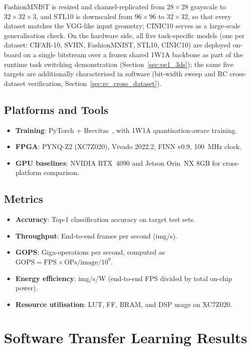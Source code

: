 \documentclass[12pt, a4paper]{report}
\numberwithin{equation}{chapter}
\numberwithin{figure}{chapter}
\numberwithin{table}{chapter}
\numberwithin{algorithm}{chapter}
\begin{document}
FashionMNIST is resized and channel-replicated from $28\times28$ grayscale to $32\times32\times3$, and STL10 is downscaled from $96\times96$ to $32\times32$, so that every dataset matches the VGG-like input geometry; CINIC10 serves as a large-scale generalisation check.
On the hardware side, all five task-specific models (one per dataset: CIFAR-10, SVHN, FashionMNIST, STL10, CINIC10) are deployed on-board on a single bitstream over a frozen shared 1W1A backbone as part of the runtime task switching demonstration (Section~\ref{sec:pe1_3ds}); the same five targets are additionally characterised in software (bit-width sweep and RC cross-dataset verification, Section~\ref{sec:rc_cross_dataset}).

\subsection{Platforms and Tools}

\begin{itemize}
    \item \textbf{Training}: PyTorch + Brevitas~\cite{Pappalardo2021Brevitas}, with 1W1A quantisation-aware training.
    \item \textbf{FPGA}: PYNQ-Z2 (XC7Z020), Vivado 2022.2, FINN v0.9, 100~MHz clock.
    \item \textbf{GPU baselines}: NVIDIA RTX~4090 and Jetson Orin~NX 8GB for cross-platform comparison.
\end{itemize}

\subsection{Metrics}

\begin{itemize}
    \item \textbf{Accuracy}: Top-1 classification accuracy on target test sets.
    \item \textbf{Throughput}: End-to-end frames per second (img/s).
    \item \textbf{GOPS}: Giga-operations per second, computed as $\text{GOPS} = \text{FPS} \times \text{OPs/image} / 10^9$.
    \item \textbf{Energy efficiency}: img/s/W (end-to-end FPS divided by total on-chip power).
    \item \textbf{Resource utilisation}: LUT, FF, BRAM, and DSP usage on XC7Z020.
\end{itemize}

\section{Software Transfer Learning Results}
\label{sec:sw_results}
\end{document}
